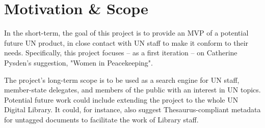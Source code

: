 
\section{Motivation \& Scope} \label{sec:motivation-scope}

In the short-term, the goal of this project is to provide an MVP of a potential future UN product, in close contact with UN staff to make it conform to their needs. Specifically, this project focuses – as a first iteration – on Catherine Pysden's suggestion, "Women in Peacekeeping".

The project's long-term scope is to be used as a search engine for UN staff, member-state delegates, and members of the public with an interest in UN topics. Potential future work could include extending the project to the whole UN Digital Library. It could, for instance, also suggest Thesaurus-compliant metadata for untagged documents to facilitate the work of Library staff.
